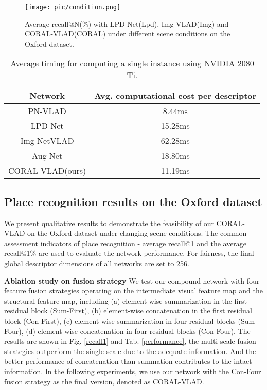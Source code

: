 \documentclass[letterpaper, 10 pt, conference]{ieeeconf}  \usepackage{tabularx}
\begin{document}
\begin{figure*}[tp]
	\centering
	\vspace{1.5mm}
	\texttt{[image: pic/condition.png]}
	
	\caption{Average recall@N(\%) with LPD-Net(Lpd), Img-VLAD(Img) and CORAL-VLAD(CORAL) under different scene conditions on the Oxford dataset.}
	\label{condition_recall}
	\vspace{-10pt}
\end{figure*}

\begin{center}
	\begin{table}[tp]
		\caption{Average timing for computing a single instance using NVIDIA 2080 Ti.}
		\centering
		\linespread{1.1}\selectfont
		\begin{tabularx}{8cm}{cc}
			\toprule[1.5pt]
			Network & Avg. computational cost per descriptor\\ [1pt]
			\hline
			PN-VLAD & 8.44ms \\[1pt]
			LPD-Net & 15.28ms \\[1pt]
			Img-NetVLAD & 62.28ms \\[1pt]
			Aug-Net & 18.80ms \\[1pt]
			\hline
			CORAL-VLAD(ours)& 11.19ms \\[1pt]
			\toprule[1.5pt]
		\end{tabularx}
		
		\label{time}
		\vspace{-12pt}
	\end{table}
\end{center}



\subsection{Place recognition results on the Oxford dataset}

We present qualitative results to demonstrate the feasibility of our CORAL-VLAD on the Oxford dataset under changing scene conditions. The common assessment indicators of place recognition - average recall@1 and the average recall@1\% are used to evaluate the network performance. For fairness, the final global descriptor dimensions of all networks are set to 256.

\textbf{Ablation study on fusion strategy} We test our compound network with four feature fusion strategies operating on the intermediate visual feature map and the structural feature map, including (a) element-wise summarization in the first residual block (Sum-First), (b) element-wise concatenation in the first residual block (Con-First), (c) element-wise summarization in four residual blocks (Sum-Four), (d) element-wise concatenation in four residual blocks (Con-Four). The results are shown in Fig. \ref{recall1} and Tab. \ref{performance}, the multi-scale fusion strategies outperform the single-scale due to the adequate information. And the better performance of concatenation than summation contributes to the intact information. In the following experiments, we use our network with the Con-Four fusion strategy as the final version, denoted as CORAL-VLAD.
\end{document}
